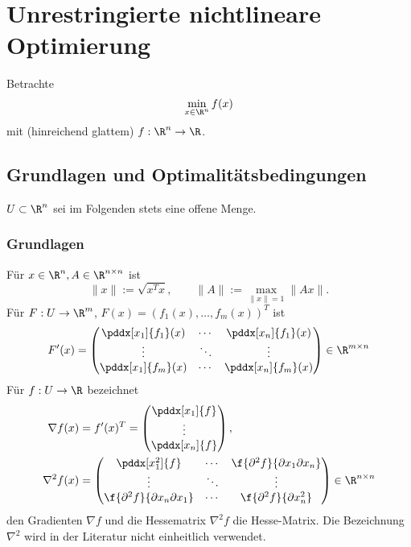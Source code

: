 \chapter{Unrestringierte nichtlineare Optimierung}


Betrachte
\[
	\min_{x\in \R^n} f(x)
\]
mit (hinreichend glattem) $f : \R^n \to \R$.


\section{Grundlagen und Optimalitätsbedingungen}


$U \subset \R^n$ sei im Folgenden stets eine offene Menge.


\subsection{Grundlagen}

Für $x \in \R^n, A \in \R^{n\times n}$ ist
\[
	\|x\| := \sqrt{x^T x}, \qquad
	\|A\| := \max_{\|x\|=1} \|Ax\|.
\]
Für $F: U \to \R^m$, $F(x) = (f_1(x), \dotsc, f_m(x))^T$ ist
\[
	F'(x) = \begin{pmatrix}
		\pddx[x_1]{f_1}(x) & \cdots & \pddx[x_n]{f_1}(x) \\
		\vdots & \ddots & \vdots \\
		\pddx[x_1]{f_m}(x) & \cdots & \pddx[x_n]{f_m}(x) \\
	\end{pmatrix} \in \R^{m\times n}
\]
Für $f: U \to \R$ bezeichnet
\begin{align*}
	\nabla f(x)
	&= f'(x)^T
	= \begin{pmatrix}
		\pddx[x_1]{f} \\
		\vdots \\
		\pddx[x_n]{f} \\
	\end{pmatrix}, \\
	\nabla^2 f(x)
	&= \begin{pmatrix}
		\pddx[x_1^2]{f} & \cdots & \f{\partial^2 f}{\partial x_1 \partial x_n} \\
		\vdots & \ddots & \vdots \\
		\f{\partial^2 f}{\partial x_n \partial x_1} & \cdots & \f{\partial^2 f}{\partial x_n^2} \\
	\end{pmatrix} \in \R^{n\times n}
\end{align*}
den Gradienten $\nabla f$ und die Hessematrix $\nabla^2 f$ die Hesse-Matrix.
Die Bezeichnung $\nabla^2$ wird in der Literatur nicht einheitlich verwendet.

